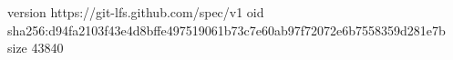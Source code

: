 version https://git-lfs.github.com/spec/v1
oid sha256:d94fa2103f43e4d8bffe497519061b73c7e60ab97f72072e6b7558359d281e7b
size 43840
